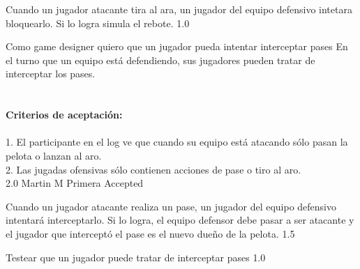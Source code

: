 		{Cuando un jugador atacante tira al ara, un jugador del equipo defensivo intetara bloquearlo. Si lo logra simula el rebote.} %
		{} %
		{1.0} %
		{} %
		{} %
		{} %

\vspace{20pt}


	{Como game designer quiero que un jugador pueda intentar interceptar pases} %
	{En el turno que un equipo está defendiendo, sus jugadores pueden tratar de interceptar los pases. \\
  \\
  \\
\textbf{Criterios de aceptación:}\\
  \\
1. El participante en el log ve que cuando su equipo está atacando sólo pasan la pelota o lanzan al aro. \\
2. Las jugadas ofensivas sólo contienen acciones de pase o tiro al aro. \\
} %
	{} %
	{2.0} %
	{Martin M} %
	{Primera} %
	{Accepted} %

		{Cuando un jugador atacante realiza un pase, un jugador del equipo defensivo intentará interceptarlo. Si lo logra, el equipo defensor debe pasar a ser atacante y el jugador que interceptó el pase es el nuevo dueño de la pelota.} %
		{} %
		{1.5} %
		{} %
		{} %
		{} %

		{Testear que un jugador puede tratar de interceptar pases} %
		{} %
		{1.0} %
		{} %
		{} %
		{} %

\vspace{20pt}





